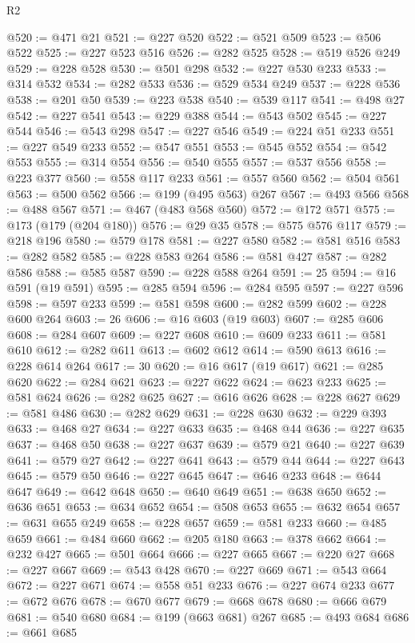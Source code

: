 \begin{lexlean}{R2}
\begin{coremodule}
@520 := @471 @21
@521 := @227 @520
@522 := @521 @509
@523 := @506 @522
@525 := @227 @523 @516
@526 := @282 @525
@528 := @519 @526 @249
@529 := @228 @528
@530 := @501 @298
@532 := @227 @530 @233
@533 := @314 @532
@534 := @282 @533
@536 := @529 @534 @249
@537 := @228 @536
@538 := @201 @50
@539 := @223 @538
@540 := @539 @117
@541 := @498 @27
@542 := @227 @541
@543 := @229 @388
@544 := @543 @502
@545 := @227 @544
@546 := @543 @298
@547 := @227 @546
@549 := @224 @51 @233
@551 := @227 @549 @233
@552 := @547 @551
@553 := @545 @552
@554 := @542 @553
@555 := @314 @554
@556 := @540 @555
@557 := @537 @556
@558 := @223 @377
@560 := @558 @117 @233
@561 := @557 @560
@562 := @504 @561
@563 := @500 @562
@566 := @199 (@495 @563) @267
@567 := @493 @566
@568 := @488 @567
@571 := @467 (@483 @568 @560)
@572 := @172 @571
@575 := @173 (@179 (@204 @180))
@576 := @29 @35
@578 := @575 @576 @117
@579 := @218 @196
@580 := @579 @178
@581 := @227 @580
@582 := @581 @516
@583 := @282 @582
@585 := @228 @583 @264
@586 := @581 @427
@587 := @282 @586
@588 := @585 @587
@590 := @228 @588 @264
@591 := 25
@594 := @16 @591 (@19 @591)
@595 := @285 @594
@596 := @284 @595
@597 := @227 @596
@598 := @597 @233
@599 := @581 @598
@600 := @282 @599
@602 := @228 @600 @264
@603 := 26
@606 := @16 @603 (@19 @603)
@607 := @285 @606
@608 := @284 @607
@609 := @227 @608
@610 := @609 @233
@611 := @581 @610
@612 := @282 @611
@613 := @602 @612
@614 := @590 @613
@616 := @228 @614 @264
@617 := 30
@620 := @16 @617 (@19 @617)
@621 := @285 @620
@622 := @284 @621
@623 := @227 @622
@624 := @623 @233
@625 := @581 @624
@626 := @282 @625
@627 := @616 @626
@628 := @228 @627
@629 := @581 @486
@630 := @282 @629
@631 := @228 @630
@632 := @229 @393
@633 := @468 @27
@634 := @227 @633
@635 := @468 @44
@636 := @227 @635
@637 := @468 @50
@638 := @227 @637
@639 := @579 @21
@640 := @227 @639
@641 := @579 @27
@642 := @227 @641
@643 := @579 @44
@644 := @227 @643
@645 := @579 @50
@646 := @227 @645
@647 := @646 @233
@648 := @644 @647
@649 := @642 @648
@650 := @640 @649
@651 := @638 @650
@652 := @636 @651
@653 := @634 @652
@654 := @508 @653
@655 := @632 @654
@657 := @631 @655 @249
@658 := @228 @657
@659 := @581 @233
@660 := @485 @659
@661 := @484 @660
@662 := @205 @180
@663 := @378 @662
@664 := @232 @427
@665 := @501 @664
@666 := @227 @665
@667 := @220 @27
@668 := @227 @667
@669 := @543 @428
@670 := @227 @669
@671 := @543 @664
@672 := @227 @671
@674 := @558 @51 @233
@676 := @227 @674 @233
@677 := @672 @676
@678 := @670 @677
@679 := @668 @678
@680 := @666 @679
@681 := @540 @680
@684 := @199 (@663 @681) @267
@685 := @493 @684
@686 := @661 @685

\end{coremodule}
\end{lexlean}
